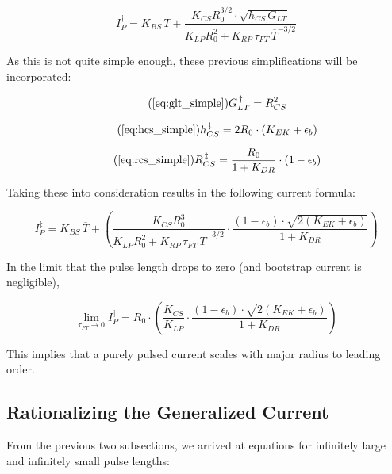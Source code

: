 \begin{equation}
	I_P^\dagger = K_{BS} \, \overline T + \frac{ K_{CS} R_0^{3/2} \cdot \sqrt{ h_{CS} \, G_{LT} } }{ K_{LP} R_0^2 + K_{RP} \, \tau_{FT} \, \overline T ^ {-3/2} }
\end{equation}

As this is not quite simple enough, these previous simplifications will be incorporated:

\begin{equation}
	\tag{\ref{eq:glt_simple}}
	G_{LT}^{\,\dagger} = R_{CS}^2
\end{equation}

\begin{equation}
	\tag{\ref{eq:hcs_simple}}
	h_{CS}^{\,\ddagger} = 2 R_0 \cdot \left( K_{EK} + \epsilon_b \right) 
\end{equation}

\begin{equation}
	\tag{\ref{eq:rcs_simple}}
	R_{CS}^{\,\ddagger} = \frac{ R_0 }{ 1 + K_{DR} } \cdot \left( 1 - \epsilon_b  \right)
\end{equation}

Taking these into consideration results in the following current formula:

\begin{equation}
	I_P^\ddagger = K_{BS} \, \overline T + \left( \frac{ K_{CS} R_0^3 }{ K_{LP} R_0^2 + K_{RP} \, \tau_{FT} \, \overline T ^ {-3/2} } \cdot \frac{ ( 1 - \epsilon_b ) \cdot \sqrt{ 2 ( K_{EK} + \epsilon_b ) } }{ 1 + K_{DR} } \right)
\end{equation}

In the limit that the pulse length drops to zero (and bootstrap current is negligible),

\begin{equation}
	\label{eq:tau_zero}
	\lim_{ \tau_{FT} \to 0 } I_P^\ddagger = R_0 \cdot \left( \frac{ K_{CS} }{ K_{LP} } \cdot \frac{ ( 1 - \epsilon_b ) \cdot \sqrt{ 2 ( K_{EK} + \epsilon_b ) } }{ 1 + K_{DR} } \right)
\end{equation}

This implies that a purely pulsed current scales with major radius to leading order.

\subsection{Rationalizing the Generalized Current}

From the previous two subsections, we arrived at equations for infinitely large and infinitely small pulse lengths:

